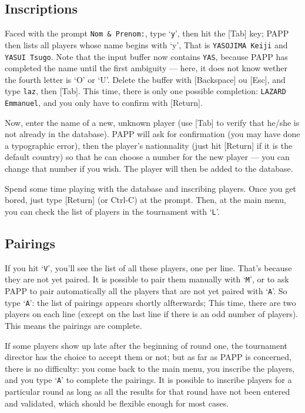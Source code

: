 \documentclass[10pt]{article}
\begin{document}
\subsection{Inscriptions}

Faced with the prompt \verb|Nom & Prenom:|, type `\verb|y|', then hit 
the [Tab] key; PAPP then lists all players whose name begins with 
`y', That is \verb|YASOJIMA Keiji| 
and \verb|YASUI Tsugo|.  Note that the input buffer now contains 
\verb|YAS|, because PAPP has completed the name until the first 
ambiguity --- here, it does not know wether the fourth letter is `O' 
or `U'.  Delete the buffer with [Backspace] ou [Esc], and type 
\verb|laz|, then [Tab].  This time, there is only one possible 
completion: \verb|LAZARD Emmanuel|, and you only have to confirm with 
[Return].

	Now, enter the name of a new, unknown player (use [Tab]
to verify that he/she is not already in the database).  PAPP will
ask for confirmation (you may have done a typographic error), then 
the player's nationnality (just hit [Return] if it is the default 
country) so that he can choose a number for the new player  --- you 
can change that number if you wish.  The player will then be added to 
the database.

Spend some time playing with the database and inscribing players.  
Once you get bored, just type [Return] (or Ctrl-C) at the prompt.  
Then, at the main menu, you can check the list of players in the 
tournament with `\verb|L|'.

\subsection{Pairings}

If you hit `\verb|V|', you'll see the list of all these players, one 
per line.  That's because they are not yet paired.  It is possible to 
pair them manually with `\verb|M|', or to ask PAPP to pair 
automatically all the players that are not yet paired with `\verb|A|'.  
So type `\verb|A|': the list of pairings appears shortly alfterwards; 
This time, there are two players on each line (except on the last line 
if there is an odd number of players).  This means the pairings are 
complete.

If some players show up late after the beginning of round one, the 
tournament director has the choice to accept them or not; but as far 
as PAPP is concerned, there is no difficulty: you come back to the 
main menu, you inscribe the players, and you type `\verb|A|' to 
complete the pairings.  It is possible to inscribe players for a 
particular round as long as all the results for that round have not 
been entered and validated, which should be flexible enough for most 
cases.
\end{document}
